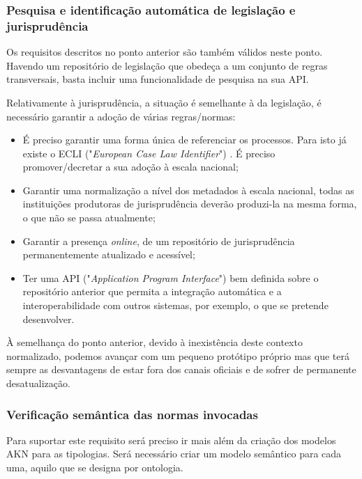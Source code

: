 \subsubsection{Pesquisa e identificação automática de legislação e jurisprudência}
\label{bases_jurisprud}

Os requisitos descritos no ponto anterior são também válidos neste ponto.
Havendo um repositório de legislação que obedeça a um conjunto de regras transversais, basta incluir uma funcionalidade de 
pesquisa na sua API.

Relativamente à jurisprudência, a situação é semelhante à da legislação, é necessário garantir a adoção de várias regras/normas:

\begin{itemize}
    \item É preciso garantir uma forma única de referenciar os processos. Para isto já existe o ECLI 
    ("\emph{European Case Law Identifier}") \cite{ECLI}. É preciso promover/decretar a sua adoção à escala nacional; 

    \item Garantir uma normalização a nível dos metadados à escala nacional, todas as instituições produtoras de 
   jurisprudência deverão produzi-la na mesma forma, o que não se passa atualmente;

    \item Garantir a presença \emph{online}, de um repositório de jurisprudência permanentemente atualizado e acessível;

    \item Ter uma API ("\emph{Application Program Interface}") bem definida sobre o repositório anterior que permita a 
    integração automática e a interoperabilidade com outros sistemas, por exemplo, o que se pretende desenvolver.
\end{itemize}

À semelhança do ponto anterior, devido à inexistência deste contexto normalizado, podemos avançar 
com um pequeno protótipo próprio mas que terá sempre as desvantagens de 
estar fora dos canais oficiais e de sofrer de permanente desatualização.

\subsubsection{Verificação semântica das normas invocadas}

Para suportar este requisito será preciso ir mais além da criação dos modelos AKN para as tipologias.
Será necessário criar um modelo semântico para cada uma, aquilo que se designa por ontologia.

